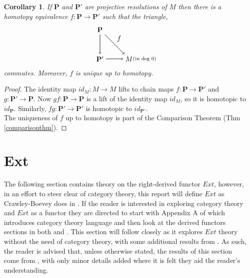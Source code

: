 \documentclass[11.5pt, twoside, a4paper, titlepage]{report}
\theoremstyle{definition}
\theoremstyle{plain}
\newtheorem{cor}[mydef]{Corollary}
\begin{document}
\begin{cor} \label{comparisoncor}
If $\mathbf{P}$ and $\mathbf{P'}$ are projective resolutions of $M$ then there is a homotopy equivalence $f: \mathbf{P} \to \mathbf{P'}$ such that the triangle, 
\begin{equation*}
\begin{tikzpicture}[->,-latex, auto, main path/.style={->, semithick}, main node/.style={}]
\node [main node]		(1) at (0,1.5)		{$\mathbf{P}$};
\node [main node]		(2) at (0,0)			{$\mathbf{P'}$};
\node [main node]		(3) at (1.5,0)		{$M$};
\node [main node]		(4) at (2.3, 0)		{$\scriptstyle{(\text{in deg } 0)}$};

\draw (1) edge [main path] node [auto] {$f$} (3);
\draw (1) edge [main path] node [auto, swap] {$$} (2);
\draw (2) edge [main path] node [auto, swap] {$$} (3);
\end{tikzpicture}
\end{equation*}
commutes. Moreover, $f$ is unique up to homotopy.
\end{cor}
\begin{proof}
The identity map $id_M: M \to M$ lifts to chain maps $f: \mathbf{P} \to \mathbf{P'}$ and $g:\mathbf{P'} \to \mathbf{P}$. Now $gf: \mathbf{P} \to \mathbf{P}$ is a lift of the identity map $id_M$, so it is homotopic to $id_{\mathbf{P}}$. Similarly, $fg: \mathbf{P'} \to \mathbf{P'}$ is homotopic to $id_{\mathbf{P'}}$.\\
The uniqueness of $f$ up to homotopy is part of the Comparison Theorem (Thm \ref{comparisonthm}).
\end{proof}








\section{Ext}

The following section contains theory on the right-derived functor $Ext$, however, in an effort to steer clear of category theory, this report will define $Ext$ as Crawley-Boevey does in \cite{CB1}. If the reader is interested in exploring category theory and $Ext$ as a functor they are directed to start with Appendix A of \cite{Weibel} which introduces category theory language and then look at the derived functors sections in both \cite{Weibel} and \cite{Rotman}. This section will follow \cite{CB1} closely as it explores $Ext$ theory without the need of category theory, with some  additional results from \cite{Weibel}. As such, the reader is advised that, unless otherwise stated, the results of this section come from \cite{CB1}, with only minor details added where it is felt they aid the reader's understanding.
\end{document}
